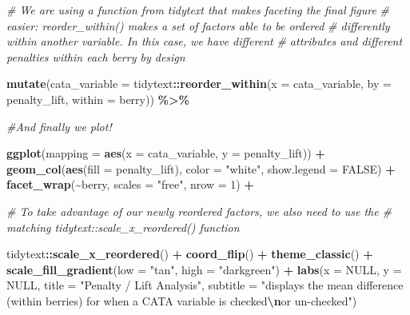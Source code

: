 \documentclass[
]{book}
\newenvironment{Shaded}{\begin{snugshade}}{\end{snugshade}}
\newcommand{\AttributeTok}[1]{\textcolor[rgb]{0.13,0.29,0.53}{#1}}
\newcommand{\CommentTok}[1]{\textcolor[rgb]{0.56,0.35,0.01}{\textit{#1}}}
\newcommand{\ConstantTok}[1]{\textcolor[rgb]{0.56,0.35,0.01}{#1}}
\newcommand{\DecValTok}[1]{\textcolor[rgb]{0.00,0.00,0.81}{#1}}
\newcommand{\FunctionTok}[1]{\textcolor[rgb]{0.13,0.29,0.53}{\textbf{#1}}}
\newcommand{\NormalTok}[1]{#1}
\newcommand{\SpecialCharTok}[1]{\textcolor[rgb]{0.81,0.36,0.00}{\textbf{#1}}}
\newcommand{\StringTok}[1]{\textcolor[rgb]{0.31,0.60,0.02}{#1}}
\begin{document}
\begin{Shaded}
\begin{Highlighting}[]
  \CommentTok{\# We are using a function from tidytext that makes faceting the final figure}
  \CommentTok{\# easier: reorder\_within() makes a set of factors able to be ordered}
  \CommentTok{\# differently within another variable.  In this case, we have different}
  \CommentTok{\# attributes and different penalties within each berry by design}
  
  \FunctionTok{mutate}\NormalTok{(}\AttributeTok{cata\_variable =}\NormalTok{ tidytext}\SpecialCharTok{::}\FunctionTok{reorder\_within}\NormalTok{(}\AttributeTok{x =}\NormalTok{ cata\_variable,}
                                                  \AttributeTok{by =}\NormalTok{ penalty\_lift,}
                                                  \AttributeTok{within =}\NormalTok{ berry)) }\SpecialCharTok{\%\textgreater{}\%}
  
  \CommentTok{\#And finally we plot!}
  
  \FunctionTok{ggplot}\NormalTok{(}\AttributeTok{mapping =} \FunctionTok{aes}\NormalTok{(}\AttributeTok{x =}\NormalTok{ cata\_variable, }\AttributeTok{y =}\NormalTok{ penalty\_lift)) }\SpecialCharTok{+}
  \FunctionTok{geom\_col}\NormalTok{(}\FunctionTok{aes}\NormalTok{(}\AttributeTok{fill =}\NormalTok{ penalty\_lift), }\AttributeTok{color =} \StringTok{"white"}\NormalTok{, }\AttributeTok{show.legend =} \ConstantTok{FALSE}\NormalTok{) }\SpecialCharTok{+} 
  \FunctionTok{facet\_wrap}\NormalTok{(}\SpecialCharTok{\textasciitilde{}}\NormalTok{berry, }\AttributeTok{scales =} \StringTok{"free"}\NormalTok{, }\AttributeTok{nrow =} \DecValTok{1}\NormalTok{) }\SpecialCharTok{+} 
  
  \CommentTok{\# To take advantage of our newly reordered factors, we also need to use the}
  \CommentTok{\# matching tidytext::scale\_x\_reordered() function}
  
\NormalTok{  tidytext}\SpecialCharTok{::}\FunctionTok{scale\_x\_reordered}\NormalTok{() }\SpecialCharTok{+} 
  \FunctionTok{coord\_flip}\NormalTok{() }\SpecialCharTok{+} 
  \FunctionTok{theme\_classic}\NormalTok{() }\SpecialCharTok{+} 
  \FunctionTok{scale\_fill\_gradient}\NormalTok{(}\AttributeTok{low =} \StringTok{"tan"}\NormalTok{, }\AttributeTok{high =} \StringTok{"darkgreen"}\NormalTok{) }\SpecialCharTok{+} 
  \FunctionTok{labs}\NormalTok{(}\AttributeTok{x =} \ConstantTok{NULL}\NormalTok{, }\AttributeTok{y =} \ConstantTok{NULL}\NormalTok{,}
       \AttributeTok{title =} \StringTok{"Penalty / Lift Analysis"}\NormalTok{,}
       \AttributeTok{subtitle =} \StringTok{"displays the mean difference (within berries) for when a CATA variable is checked}\SpecialCharTok{\textbackslash{}n}\StringTok{or un{-}checked"}\NormalTok{)}
\end{Highlighting}
\end{Shaded}
\end{document}
